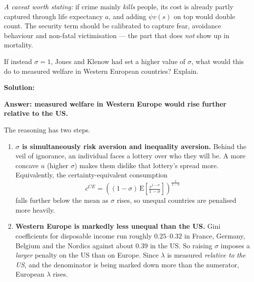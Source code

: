\documentclass[12pt, letterpaper]{article}
\newcommand{\E}{\mathrm{E}}
\begin{document}
\begin{tcolorbox}[evenbox,title={Problem 2.2 \quad Other Things that Matter}]
\begin{enumerate}
\emph{A caveat worth stating:} if crime mainly \emph{kills} people, its cost is already
partly captured through life expectancy $a$, and adding $\psi v(s)$ on top would double
count. The security term should be calibrated to capture fear, avoidance behaviour and
non-fatal victimisation --- the part that does \emph{not} show up in mortality.

\end{enumerate}
\end{tcolorbox}

\begin{tcolorbox}[oddbox,title={Problem 2.9 \quad Risk Aversion and Welfare in Western Europe}]
\begin{tcolorbox}[questionbox]
If instead $\sigma = 1$, Jones and Klenow had set a higher value of $\sigma$, what would this
do to measured welfare in Western European countries? Explain.
\end{tcolorbox}

\textbf{Solution:}

\textbf{Answer: measured welfare in Western Europe would rise further relative to the US.}

The reasoning has two steps.

\begin{enumerate}

\item \textbf{$\sigma$ is simultaneously risk aversion and inequality aversion.} Behind the
veil of ignorance, an individual faces a lottery over who they will be. A more concave $u$
(higher $\sigma$) makes them dislike that lottery's spread more. Equivalently, the
certainty-equivalent consumption
$$c^{CE} = \left((1-\sigma)\,\E\!\left[\tfrac{c^{1-\sigma}}{1-\sigma}\right]\right)^{\frac{1}{1-\sigma}}$$
falls further below the mean as $\sigma$ rises, so unequal countries are penalised more
heavily.

\item \textbf{Western Europe is markedly less unequal than the US.} Gini coefficients for
disposable income run roughly $0.25$--$0.32$ in France, Germany, Belgium and the Nordics
against about $0.39$ in the US. So raising $\sigma$ imposes a \emph{larger} penalty on the
US than on Europe. Since $\lambda$ is measured \emph{relative to the US}, and the
denominator is being marked down more than the numerator, European $\lambda$ rises.


\end{enumerate}
\end{tcolorbox}
\end{document}

